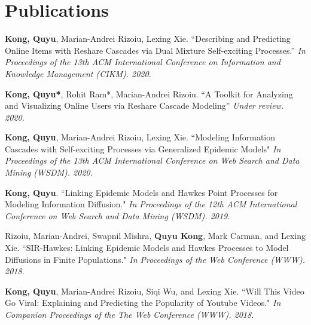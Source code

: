 \documentclass[a4paper,10pt]{article}
\newcommand{\tabitem}{~~\llap{\textbullet}~~}
\begin{document}


\section{Publications}
\begin{enumerate}[label={[\arabic*]}]
    \item \textbf{Kong, Quyu}, Marian-Andrei Rizoiu, Lexing Xie. ``Describing and Predicting Online Items with Reshare Cascades via Dual Mixture Self-exciting Processes.'' \textit{In Proceedings of the 13th ACM International Conference on Information and Knowledge Management (CIKM). 2020.}
     \item \textbf{Kong, Quyu*}, Rohit Ram*, Marian-Andrei Rizoiu. ``A Toolkit for Analyzing and Visualizing Online Users via Reshare Cascade Modeling'' \textit{Under review. 2020.}
    \item \textbf{Kong, Quyu}, Marian-Andrei Rizoiu, Lexing Xie. ``Modeling Information Cascades with Self-exciting Processes via Generalized Epidemic Models" \textit{In Proceedings of the 13th ACM International Conference on Web Search and Data Mining (WSDM). 2020.}
    \item \textbf{Kong, Quyu}. ``Linking Epidemic Models and Hawkes Point Processes for Modeling Information Diffusion." \textit{In Proceedings of the 12th ACM International Conference on Web Search and Data Mining (WSDM). 2019.}
    \item Rizoiu, Marian-Andrei, Swapnil Mishra, \textbf{Quyu Kong}, Mark Carman, and Lexing Xie. ``SIR-Hawkes: Linking Epidemic Models and Hawkes Processes to Model Diffusions in Finite Populations." \textit{In Proceedings of the Web Conference (WWW). 2018.}
    \item \textbf{Kong, Quyu}, Marian-Andrei Rizoiu, Siqi Wu, and Lexing Xie. ``Will This Video Go Viral: Explaining and Predicting the Popularity of Youtube Videos." \textit{In Companion Proceedings of the The Web Conference (WWW). 2018.}
\end{enumerate}
\end{document}
